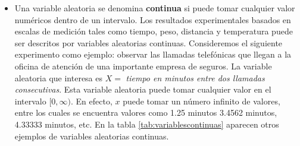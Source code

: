 \documentclass[
  11pt,
]{book}
\providecommand{\tightlist}{%
  \setlength{\itemsep}{0pt}\setlength{\parskip}{0pt}}
\theoremstyle{definition}
\theoremstyle{definition}
\theoremstyle{definition}
\theoremstyle{definition}
\theoremstyle{remark}
\begin{document}
\begin{table}[H]
\centering
\caption{\label{tab:variablesdiscretas}Ejemplos de variables aleatorias discretas}
\centering
{}
\end{table}

\begin{itemize}
\tightlist
\item
  Una variable aleatoria se denomina \textbf{continua} si puede tomar cualquier valor numéricos dentro de un intervalo. Los resultados experimentales basados en escalas de medición tales como tiempo, peso, distancia y temperatura puede ser descritos por variables aleatorias continuas. Consideremos el siguiente experimento como ejemplo: observar las llamadas telefónicas que llegan a la oficina de atención de una importante empresa de seguros. La variable aleatoria que interesa es \(X =\) \emph{tiempo en minutos entre dos llamadas consecutivas}. Esta variable aleatoria puede tomar cualquier valor en el intervalo \([0, \infty)\). En efecto, \(x\) puede tomar un número infinito de valores, entre los cuales se encuentra valores como 1.25 minutos 3.4562 minutos, 4.33333 minutos, etc. En la tabla \ref{tab:variablescontinuas} aparecen otros ejemplos de variables aleatorias continuas.
\end{itemize}
\end{document}
